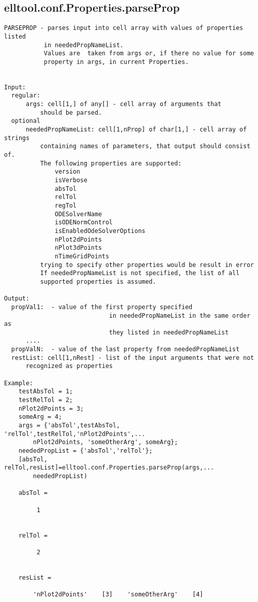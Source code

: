 \subsection{\texorpdfstring{elltool.conf.Properties.parseProp}{parseProp}}\label{method:elltool.conf.Properties.parseProp}
\begin{verbatim}
PARSEPROP - parses input into cell array with values of properties listed
           in neededPropNameList.
           Values are  taken from args or, if there no value for some
           property in args, in current Properties.


Input:
  regular:
      args: cell[1,] of any[] - cell array of arguments that
          should be parsed.
  optional
      neededPropNameList: cell[1,nProp] of char[1,] - cell array of strings
          containing names of parameters, that output should consist of.
          The following properties are supported:
              version
              isVerbose
              absTol
              relTol
              regTol
              ODESolverName
              isODENormControl
              isEnabledOdeSolverOptions
              nPlot2dPoints
              nPlot3dPoints
              nTimeGridPoints
          trying to specify other properties would be result in error
          If neededPropNameList is not specified, the list of all
          supported properties is assumed.

Output:
  propVal1:  - value of the first property specified
                             in neededPropNameList in the same order as
                             they listed in neededPropNameList
      ....
  propValN:  - value of the last property from neededPropNameList
  restList: cell[1,nRest] - list of the input arguments that were not
      recognized as properties

Example:
    testAbsTol = 1;
    testRelTol = 2;
    nPlot2dPoints = 3;
    someArg = 4;
    args = {'absTol',testAbsTol, 'relTol',testRelTol,'nPlot2dPoints',...
        nPlot2dPoints, 'someOtherArg', someArg};
    neededPropList = {'absTol','relTol'};
    [absTol, relTol,resList]=elltool.conf.Properties.parseProp(args,...
        neededPropList)

    absTol =

         1


    relTol =

         2


    resList =

        'nPlot2dPoints'    [3]    'someOtherArg'    [4]
\end{verbatim}
